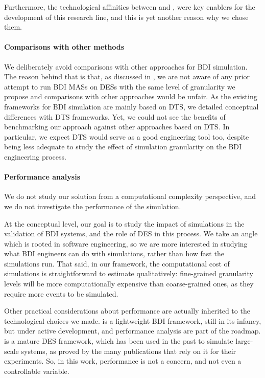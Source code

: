 Furthermore,
the technological affinities between \jakta{} and \alchemist{},
were key enablers for the development of this research line,
and this is yet another reason why we chose them.

\paragraph{Comparisons with other methods}

We deliberately avoid comparisons with other approaches for \ac{BDI} simulation.
%
The reason behind that is that,
as discussed in ,
we are not aware of any prior attempt to run \ac{BDI} \acp{MAS} on \acp{DES}
with the same level of granularity we propose
and comparisons with other approaches would be unfair.
%
As the existing frameworks for \ac{BDI} simulation are mainly based on \ac{DTS},
we detailed conceptual differences with \ac{DTS} frameworks.
%
Yet,
we could not see the benefits of benchmarking our approach against other approaches based on \ac{DTS}.
%
In particular,
we expect \ac{DTS} would serve as a good engineering tool too,
despite being less adequate to study the effect of simulation granularity on the \ac{BDI} engineering process.

\paragraph{Performance analysis}

We do not study our solution from a computational complexity perspective,
and we do not investigate the performance of the simulation.

At the conceptual level,
our goal is to study the impact of simulations in the validation of \ac{BDI} systems,
and the role of \ac{DES} in this process.
%
We take an angle which is rooted in software engineering,
so we are more interested in studying what \ac{BDI} engineers can do with simulations,
rather than how fast the simulations run.
%
That said,
in our framework,
the computational cost of simulations is straightforward to estimate qualitatively:
fine-grained granularity levels will be more computationally expensive than coarse-grained ones,
as they require more events to be simulated.

Other practical considerations about performance are actually inherited to the technological choices we made.
%
\jakta{} is a lightweight \ac{BDI} framework,
still in its infancy,
but under active development,
and performance analysis are part of the roadmap.
%
\alchemist{} is a mature \ac{DES} framework,
which has been used in the past to simulate large-scale systems,
as proved by the many publications that rely on it for their experiments.
%
So,
in this work,
performance is not a concern,
and not even a controllable variable.

